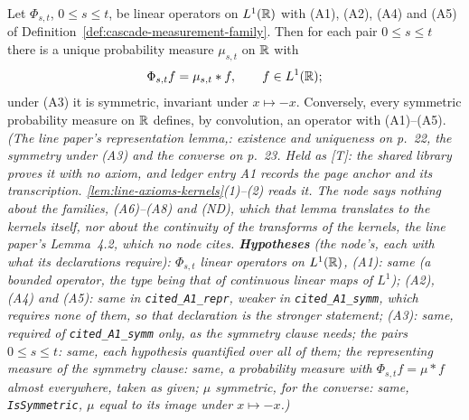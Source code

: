 \begin{theorem}
\label{thm:cited-A1}
\leanok
{}
Let $\Phi_{s,t}$, $0 \le s \le t$, be linear operators on $L^1(\mathbb{R})$ with (A1), (A2), (A4) and
(A5) of Definition~\ref{def:cascade-measurement-family}. Then for each pair $0 \le s \le t$ there
is a unique probability measure $\mu_{s,t}$ on $\mathbb{R}$ with
\[
  \Phi_{s,t}f = \mu_{s,t} * f, \qquad f \in L^1(\mathbb{R});
\]
under (A3) it is symmetric, invariant under $x \mapsto -x$. Conversely, every symmetric
probability measure on $\mathbb{R}$ defines, by convolution, an operator with (A1)--(A5).
\statusT\quad\emph{(The line paper's representation lemma,: existence and uniqueness on p.~22, the symmetry under (A3) and the converse on
p.~23. Held as [T]: the shared library proves it with no axiom, and ledger entry A1 records the
page anchor and its transcription. \ref{lem:line-axioms-kernels}(1)--(2) reads it. The node says
nothing about the families, (A6)--(A8) and (ND), which that lemma translates to the kernels
itself, nor about the continuity of the transforms of the kernels, the line paper's Lemma~4.2,
which no node cites.
\textbf{Hypotheses} (the node's, each with what its declarations require): $\Phi_{s,t}$ linear operators
on $L^1(\mathbb{R})$, (A1): same (a bounded operator, the type being that of continuous linear maps of $L^1$); (A2), (A4) and (A5): same in
\texttt{cited\_A1\_repr}, weaker in \texttt{cited\_A1\_symm}, which requires none of them, so that
declaration is the stronger statement; (A3): same, required of \texttt{cited\_A1\_symm} only, as the
symmetry clause needs; the pairs $0 \le s \le t$: same, each hypothesis quantified over all of
them; the representing measure of the symmetry clause: same, a probability measure with
$\Phi_{s,t}f = \mu * f$ almost everywhere, taken as given; $\mu$ symmetric, for the converse: same,
\texttt{IsSymmetric}, $\mu$ equal to its image under $x \mapsto -x$.)}
\end{theorem}

